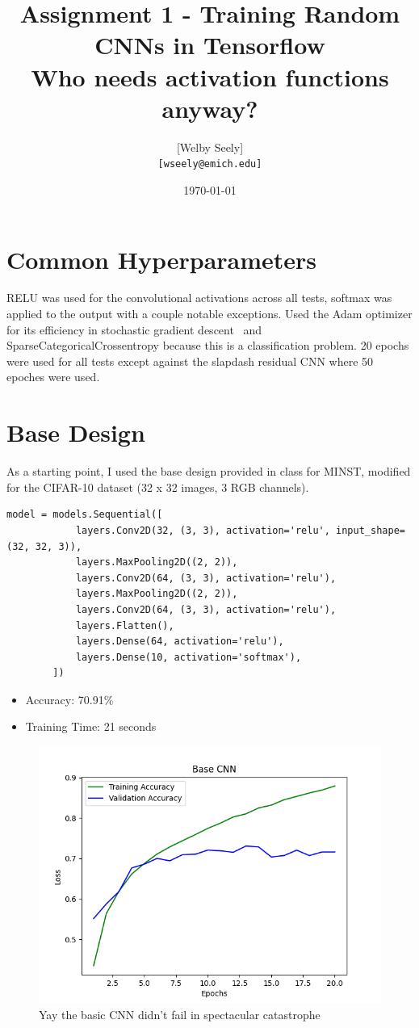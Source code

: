 \documentclass{article}
\title{Assignment 1 - Training Random CNNs in Tensorflow \\
\large Who needs activation functions anyway?}
\author{
    [Welby Seely] \\
    \texttt{[wseely@emich.edu]}
}
\date{\today}
\begin{document}
    \maketitle

    \section{Common Hyperparameters}\label{sec:preamble}

    RELU was used for the convolutional activations across all tests, softmax was applied to the output with a couple notable exceptions.
    Used the Adam optimizer for its efficiency in stochastic gradient descent~\cite{kingma2017adammethodstochasticoptimization} and SparseCategoricalCrossentropy because this is a classification problem.
    20 epochs were used for all tests except against the slapdash residual CNN where 50 epoches were used.

    \section{Base Design}\label{sec:base-design}

    As a starting point, I used the base design provided in class for MINST, modified for the CIFAR-10 dataset (32 x 32 images, 3 RGB channels).
    \\
    \begin{lstlisting}[label={lst:base_cnn}]
        model = models.Sequential([
            layers.Conv2D(32, (3, 3), activation='relu', input_shape=(32, 32, 3)),
            layers.MaxPooling2D((2, 2)),
            layers.Conv2D(64, (3, 3), activation='relu'),
            layers.MaxPooling2D((2, 2)),
            layers.Conv2D(64, (3, 3), activation='relu'),
            layers.Flatten(),
            layers.Dense(64, activation='relu'),
            layers.Dense(10, activation='softmax'),
        ])
    \end{lstlisting}

    \begin{itemize}
        \item Accuracy: 70.91\%
        \item Training Time: 21 seconds
    \end{itemize}

    \begin{figure}[!htbp]
        \centerline{\includegraphics[width=0.55\columnwidth]{Base CNN}}
        \caption{Yay the basic CNN didn't fail in spectacular catastrophe}
        \label{fig:base-cnn}
    \end{figure}
\end{document}
